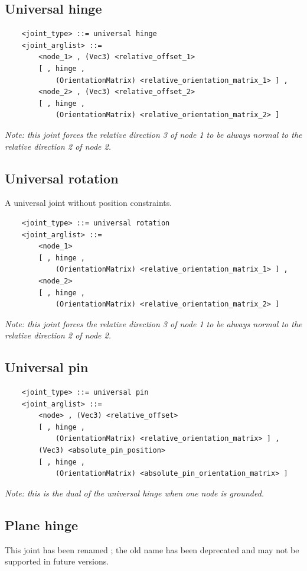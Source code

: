 \subsection{Universal hinge}
\begin{verbatim}
    <joint_type> ::= universal hinge
    <joint_arglist> ::= 
        <node_1> , (Vec3) <relative_offset_1> 
        [ , hinge , 
            (OrientationMatrix) <relative_orientation_matrix_1> ] ,
        <node_2> , (Vec3) <relative_offset_2>
        [ , hinge , 
            (OrientationMatrix) <relative_orientation_matrix_2> ]
\end{verbatim}
{\em
    Note: this joint forces the relative direction 3 of node 1 to be always 
    normal to the relative direction 2 of node 2.
}

\subsection{Universal rotation}
A universal joint without position constraints.
\begin{verbatim}
    <joint_type> ::= universal rotation
    <joint_arglist> ::= 
        <node_1>
        [ , hinge , 
            (OrientationMatrix) <relative_orientation_matrix_1> ] ,
        <node_2>
        [ , hinge , 
            (OrientationMatrix) <relative_orientation_matrix_2> ]
\end{verbatim}
{\em
    Note: this joint forces the relative direction 3 of node 1 to be always 
    normal to the relative direction 2 of node 2.
}

\subsection{Universal pin}
\begin{verbatim}
    <joint_type> ::= universal pin
    <joint_arglist> ::= 
        <node> , (Vec3) <relative_offset>
        [ , hinge , 
            (OrientationMatrix) <relative_orientation_matrix> ] ,
        (Vec3) <absolute_pin_position>
        [ , hinge , 
            (OrientationMatrix) <absolute_pin_orientation_matrix> ]
\end{verbatim}
{\em
    Note: this is the dual of the universal hinge when one node is grounded.
}

\subsection{Plane hinge}
This joint has been renamed ; the old name has been
deprecated and may not be supported in future versions.

